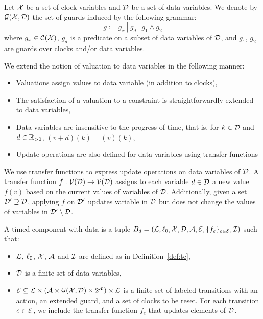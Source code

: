 \begin{definition}\label{def:guard}
  Let $\mathcal{X}$ be a set of clock variables and $\mathcal{D}$ be a set of
  data variables. We denote by $\mathcal{G(X,D)}$ the set of guards induced
  by the following grammar:
  \begin{displaymath}
    g:=g_x \ | \ g_d \ | \ g_1\wedge g_2
  \end{displaymath}
  where $g_x\in\mathcal{C(X)}$, $g_d$ is a predicate on a subset of data variables
  of $\mathcal{D}$, and $g_1$, $g_2$ are guards over clocks and/or data variables.
\end{definition}

We extend the notion of valuation to data variables in the following manner:
\begin{itemize}
  \item Valuations assign values to data variable (in addition to clocks),
  \item The satisfaction of a valuation to a constraint is straightforwardly 
    extended to data variables,
  \item Data variables are insensitive to the progress of time, that is, for $k\in\mathcal{D}$ and
    $d\in\mathbb{R}_{> 0}$, $(v+d)(k)=(v)(k)$,
  \item Update operations are also defined for data variables using transfer functions

\end{itemize}

We use transfer functions to express update operations on data variables of $\mathcal{D}$. A transfer 
function $f:\mathcal{V}(\mathcal{D})\to\mathcal{V}(\mathcal{D})$ assigns to each variable $d\in\mathcal{D}$ a new value $f(v)$ based on the
current values of variables of $\mathcal{D}$. Additionally, given a set $\mathcal{D}'\supseteq\mathcal{D}$, applying $f$
on $\mathcal{D}'$ updates variable in $\mathcal{D}$  but does not change the values of variables in 
$\mathcal{D}'\setminus\mathcal{D}$.

\begin{definition}\label{def:tce}
  A timed component with data is a tuple 
  $B_d=(\mathcal{L},\ell_0,\mathcal{X},\mathcal{D},\mathcal{A},\mathcal{E},\{f_e\}_{e\in\mathcal{E}},\mathcal{I})$ such that:
  \begin{itemize}
    \item $\mathcal{L}$, $\ell_0$, $\mathcal{X}$, $\mathcal{A}$ and $\mathcal{I}$ are defined as
      in Definition~\ref{def:tc},
    \item $\mathcal{D}$ is a finite set of data variables,
    \item $\mathcal{E}\subseteq\mathcal{L}\times(\mathcal{A}\times\mathcal{G(X,D)}\times2^{\mathcal{X}})\times\mathcal{L}$
    is a finite set of labeled transitions with an action, an extended guard, 
      and a set of clocks to be reset. For each transition $e\in\mathcal{E}$, we include the transfer
      function $f_e$ that updates elements of $\mathcal{D}$. 
  \end{itemize}
\end{definition}

